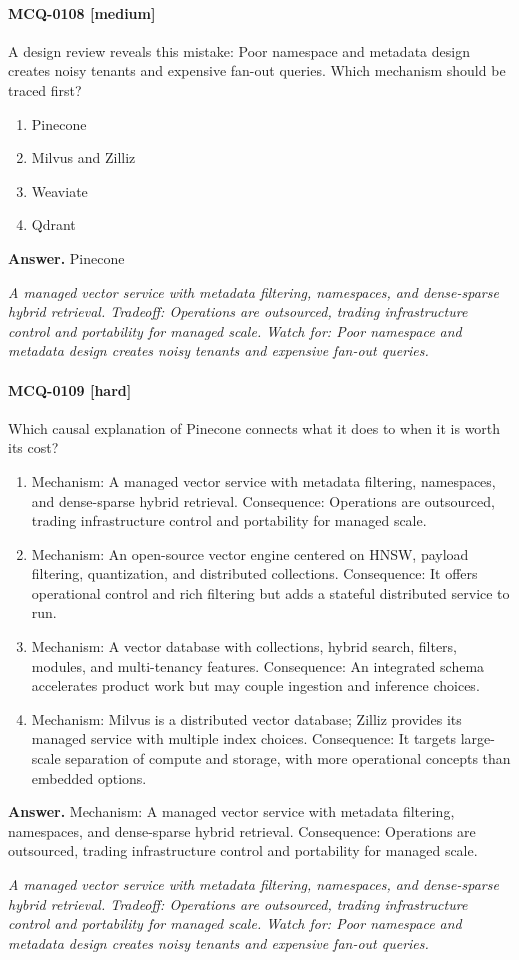\paragraph{MCQ-0108 [medium]} A design review reveals this mistake: Poor namespace and metadata design creates noisy tenants and expensive fan-out queries. Which mechanism should be traced first?
\begin{enumerate}[label=\Alph*.]
\item Pinecone
\item Milvus and Zilliz
\item Weaviate
\item Qdrant
\end{enumerate}
\noindent\textbf{Answer.} Pinecone
\par\textit{A managed vector service with metadata filtering, namespaces, and dense-sparse hybrid retrieval. Tradeoff: Operations are outsourced, trading infrastructure control and portability for managed scale. Watch for: Poor namespace and metadata design creates noisy tenants and expensive fan-out queries.}
\paragraph{MCQ-0109 [hard]} Which causal explanation of Pinecone connects what it does to when it is worth its cost?
\begin{enumerate}[label=\Alph*.]
\item Mechanism: A managed vector service with metadata filtering, namespaces, and dense-sparse hybrid retrieval. Consequence: Operations are outsourced, trading infrastructure control and portability for managed scale.
\item Mechanism: An open-source vector engine centered on HNSW, payload filtering, quantization, and distributed collections. Consequence: It offers operational control and rich filtering but adds a stateful distributed service to run.
\item Mechanism: A vector database with collections, hybrid search, filters, modules, and multi-tenancy features. Consequence: An integrated schema accelerates product work but may couple ingestion and inference choices.
\item Mechanism: Milvus is a distributed vector database; Zilliz provides its managed service with multiple index choices. Consequence: It targets large-scale separation of compute and storage, with more operational concepts than embedded options.
\end{enumerate}
\noindent\textbf{Answer.} Mechanism: A managed vector service with metadata filtering, namespaces, and dense-sparse hybrid retrieval. Consequence: Operations are outsourced, trading infrastructure control and portability for managed scale.
\par\textit{A managed vector service with metadata filtering, namespaces, and dense-sparse hybrid retrieval. Tradeoff: Operations are outsourced, trading infrastructure control and portability for managed scale. Watch for: Poor namespace and metadata design creates noisy tenants and expensive fan-out queries.}
